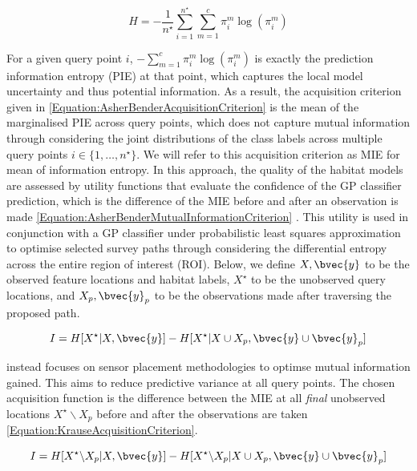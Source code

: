 		\begin{equation}
			H = - \frac{1}{n^{\star}} \sum_{i = 1}^{n^{\star}} \sum_{m = 1}^{c} \pi^{m}_{i} \log(\pi^{m}_{i})
		\label{Equation:AsherBenderAcquisitionCriterion}
		\end{equation}
		
		For a given query point $i$, $- \sum_{m = 1}^{c} \pi^{m}_{i} \log(\pi^{m}_{i})$ is exactly the prediction information entropy (PIE) at that point, which captures the local model uncertainty and thus potential information. As a result, the acquisition criterion given in \eqref{Equation:AsherBenderAcquisitionCriterion} is the mean of the marginalised PIE across query points, which does not capture mutual information through considering the joint distributions of the class labels across multiple query points $i \in \{1, \dots, n^{\star}\}$. We will refer to this acquisition criterion as MIE for mean of information entropy. In this approach, the quality of the habitat models are assessed by utility functions that evaluate the confidence of the GP classifier prediction, which is the difference of the MIE before and after an observation is made \eqref{Equation:AsherBenderMutualInformationCriterion} \citep{Rigby:ROB20372}. This utility is used in conjunction with a GP classifier under probabilistic least squares approximation to optimise selected survey paths through considering the differential entropy across the entire region of interest (ROI). Below, we define $X, \bvec{y}$ to be the observed feature locations and habitat labels, $X^{\star}$ to be the unobserved query locations, and $X_{p}, \bvec{y}_{p}$ to be the observations made after traversing the proposed path.
	
		\begin{equation}
			I = H[X^{\star} | X, \bvec{y}] - H[X^{\star} | X \cup X_{p}, \bvec{y} \cup \bvec{y}_{p}]
		\label{Equation:AsherBenderMutualInformationCriterion}
		\end{equation}
		
		\cite{Krause:2008:NSP:1390681.1390689} instead focuses on sensor placement methodologies to optimse mutual information gained. This aims to reduce predictive variance at all query points. The chosen acquisition function is the difference between the MIE at all \textit{final} unobserved locations $X^{\star} \backslash X_{p}$ before and after the observations are taken \eqref{Equation:KrauseAcquisitionCriterion}.
		
		\begin{equation}
			I = H[X^{\star} \backslash X_{p} | X, \bvec{y}] - H[X^{\star} \backslash X_{p} | X \cup X_{p}, \bvec{y} \cup \bvec{y}_{p}]
		\label{Equation:KrauseAcquisitionCriterion}
		\end{equation}
		
